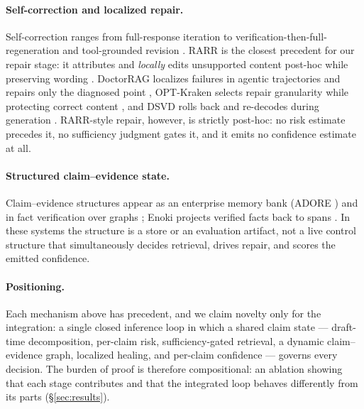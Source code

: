 \paragraph{Self-correction and localized repair.}
Self-correction ranges from full-response iteration
\cite{madaan2023selfrefine,shinn2023reflexion} to verification-then-full-
regeneration \cite{dhuliawala2023cove} and tool-grounded revision
\cite{gou2024critic}. RARR is the closest precedent for our repair stage:
it attributes and \emph{locally} edits unsupported content post-hoc while
preserving wording \cite{gao2023rarr}. DoctorRAG localizes failures in
agentic trajectories and repairs only the diagnosed point
\cite{jiao2026doctorrag}, OPT-Kraken selects repair granularity while
protecting correct content \cite{wu2026optkraken}, and DSVD rolls back and
re-decodes during generation \cite{guo2025dsvd}. RARR-style repair,
however, is strictly post-hoc: no risk estimate precedes it, no sufficiency
judgment gates it, and it emits no confidence estimate at all.

\paragraph{Structured claim--evidence state.}
Claim--evidence structures appear as an enterprise memory bank (ADORE
\cite{you2026adore}) and in fact verification over graphs
\cite{zhang2024causalwalk,guo2025muplon}; Enoki projects verified facts back
to spans \cite{rykov2026enoki}. In these systems the structure is a store or
an evaluation artifact, not a live control structure that simultaneously
decides retrieval, drives repair, and scores the emitted confidence.

\paragraph{Positioning.}
Each mechanism above has precedent, and we claim novelty only for the
integration: a single closed inference loop in which a shared claim state ---
draft-time decomposition, per-claim risk, sufficiency-gated retrieval, a
dynamic claim--evidence graph, localized healing, and per-claim
confidence --- governs every decision. The burden of proof is therefore
compositional: an ablation showing that each stage contributes and that the
integrated loop behaves differently from its parts (\S\ref{sec:results}).
